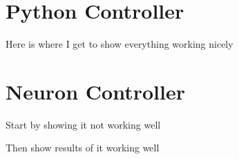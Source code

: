 \section{Python Controller}

Here is where I get to show everything working nicely

\section{Neuron Controller}

Start by showing it not working well

Then show results of it working well
